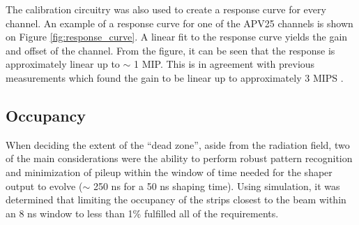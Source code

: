 The calibration circuitry was also used to create a response
curve for every channel.  An example of a response curve for one of the 
APV25 channels is shown on Figure \ref{fig:response_curve}.  A linear fit
to the response curve yields the gain and offset of the channel. From the figure, 
it can be seen that the response is approximately linear up to $\sim$ 1 MIP.
This is in agreement with previous measurements which found the gain to be 
linear up to approximately 3 MIPS \cite{French:2001xb}.

\subsection{Occupancy}

When deciding the extent of the ``dead zone'', aside from the radiation field, 
two of the main considerations were the ability to perform robust pattern 
recognition and minimization of pileup within the window of time needed for 
the shaper output to evolve ($\sim$ 250 ns for a 50 ns shaping time).  Using
simulation, it was determined that limiting the occupancy of the strips closest
to the beam within an 8 ns window to less than 1\% fulfilled all of the requirements. 


